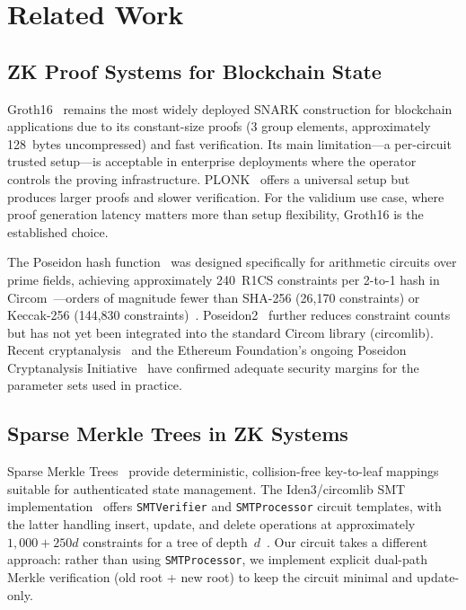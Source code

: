 \section{Related Work}

\subsection{ZK Proof Systems for Blockchain State}

Groth16~\cite{groth2016size} remains the most widely deployed SNARK
construction for blockchain applications due to its constant-size proofs
(3 group elements, approximately 128~bytes uncompressed) and fast
verification. Its main limitation---a per-circuit trusted setup---is
acceptable in enterprise deployments where the operator controls the
proving infrastructure. PLONK~\cite{gabizon2019plonk} offers a universal
setup but produces larger proofs and slower verification. For the
validium use case, where proof generation latency matters more than
setup flexibility, Groth16 is the established choice.

The Poseidon hash function~\cite{grassi2021poseidon} was designed
specifically for arithmetic circuits over prime fields, achieving
approximately 240~R1CS constraints per 2-to-1 hash in Circom~\cite{elamrani2020merkle}---orders of magnitude fewer than SHA-256
(26,170 constraints) or Keccak-256 (144,830 constraints)~\cite{bkomuves2023hash}.
Poseidon2~\cite{grassi2023poseidon2} further reduces constraint counts
but has not yet been integrated into the standard Circom library
(circomlib). Recent cryptanalysis~\cite{grassi2025grobner} and the
Ethereum Foundation's ongoing Poseidon Cryptanalysis
Initiative~\cite{ethereum2024poseidon} have confirmed adequate security
margins for the parameter sets used in practice.

\subsection{Sparse Merkle Trees in ZK Systems}

Sparse Merkle Trees~\cite{baylina2019smt} provide deterministic,
collision-free key-to-leaf mappings suitable for authenticated state
management. The Iden3/circomlib SMT implementation~\cite{iden3smt}
offers \texttt{SMTVerifier} and \texttt{SMTProcessor} circuit templates,
with the latter handling insert, update, and delete operations at
approximately $1{,}000 + 250d$ constraints for a tree of depth~$d$~\cite{elamrani2020merkle}.
Our circuit takes a different approach: rather than using \texttt{SMTProcessor},
we implement explicit dual-path Merkle verification (old root + new root)
to keep the circuit minimal and update-only.

